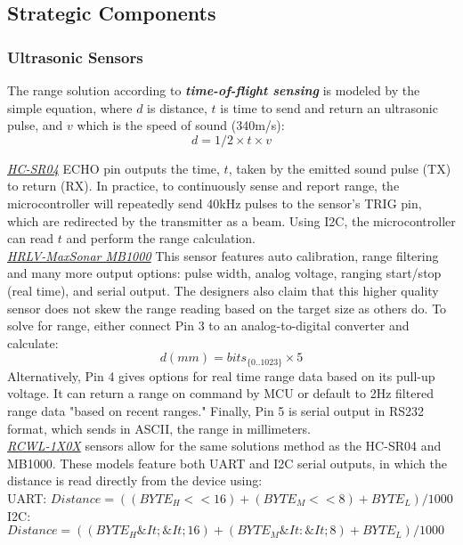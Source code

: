 \subsection{Strategic Components}

\subsubsection{Ultrasonic Sensors}
\noindent The range solution according to \textbf{\textit{time-of-flight sensing}} is modeled by the simple equation, where $d$ is distance, $t$ is time to send and return an ultrasonic pulse, and $v$ which is the speed of sound (340m/s):
$$d = 1/2 \times t \times v$$

\noindent \underline{\textit{HC-SR04}} ECHO pin outputs the time, $t$, taken by the emitted sound pulse (TX) to return (RX). In practice, to continuously sense and report range, the microcontroller will repeatedly send 40kHz pulses to the sensor's TRIG pin, which are redirected by the transmitter as a beam. Using I2C, the microcontroller can read $t$ and perform the range calculation.\\

\noindent \underline{\textit{HRLV-MaxSonar MB1000}} This sensor features auto calibration, range filtering and many more output options: pulse width, analog voltage, ranging start/stop (real time), and serial output. The designers also claim that this higher quality sensor does not skew the range reading based on the target size as others do. To solve for range, either connect Pin 3 to an analog-to-digital converter and calculate:
$$d (mm) = bits_{\{0..1023\}} \times 5$$
Alternatively, Pin 4 gives options for real time range data based on its pull-up voltage. It can return a range on command by MCU or default to 2Hz filtered range data "based on recent ranges." Finally, Pin 5 is serial output in RS232 format, which sends in ASCII, the range in millimeters.\\

\noindent \underline{\textit{RCWL-1X0X}} sensors allow for the same solutions method as the HC-SR04 and MB1000. These models feature both UART and I2C serial outputs, in which the distance is read directly from the device using:\\
UART: $Distance = ((BYTE_H << 16) + (BYTE_M << 8) + BYTE_L) /1000$\\
I2C: $Distance = ((BYTE_H\&It; \&It; 16) + (BYTE_M\&It: \&It; 8)+BYTE_L) /1000$\\

